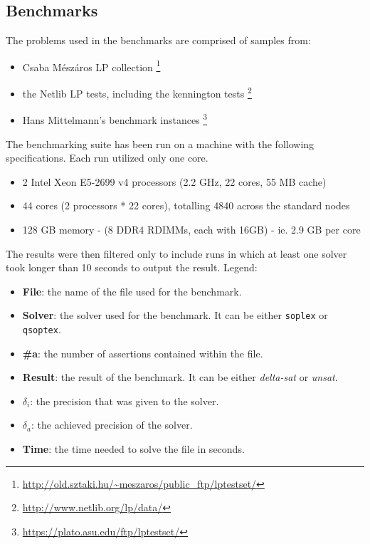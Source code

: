 \begin{appendices}
    \chapter{Benchmarks}\label{appendix:benchmarks}
    The problems used in the benchmarks are comprised of samples from:

    \begin{itemize}
        \item Csaba Mészáros LP collection  \footnote{\url{http://old.sztaki.hu/~meszaros/public_ftp/lptestset/}}
        \item the Netlib LP tests, including the kennington tests \footnote{\url{http://www.netlib.org/lp/data/}}
        \item Hans Mittelmann's benchmark instances \footnote{\url{https://plato.asu.edu/ftp/lptestset/}}
    \end{itemize}
    The benchmarking suite has been run on a machine with the following specifications.
    Each run utilized only one core.

    \begin{itemize}
        \item 2 Intel Xeon E5-2699 v4 processors (2.2 GHz, 22 cores, 55 MB cache)
        \item 44 cores (2 processors * 22 cores), totalling 4840 across the standard nodes
        \item 128 GB memory - (8 DDR4 RDIMMs, each with 16GB) - ie. 2.9 GB per core
    \end{itemize}
    The results were then filtered only to include runs in which at least one solver took longer than 10 seconds to output the result.
    Legend:

    \begin{itemize}
        \item \textbf{File}: the name of the file used for the benchmark.
        \item \textbf{Solver}: the solver used for the benchmark. It can be either \texttt{soplex} or \texttt{qsoptex}.
        \item \textbf{\#a}: the number of assertions contained within the file.
        \item \textbf{Result}: the result of the benchmark. It can be either \textit{delta-sat} or \textit{unsat}.
        \item \textbf{$\delta_i$}: the precision that was given to the solver.
        \item \textbf{$\delta_a$}: the achieved precision of the solver.
        \item \textbf{Time}: the time needed to solve the file in seconds.
    \end{itemize}


\end{appendices}
